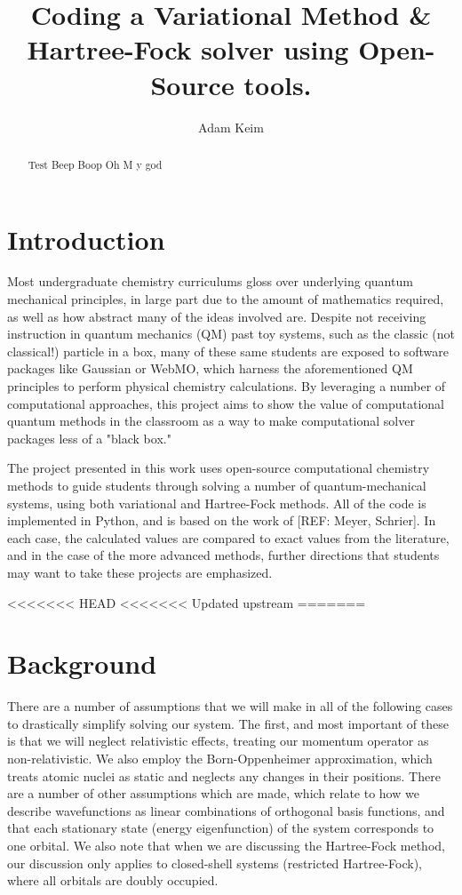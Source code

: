 \documentclass[journal=jacsat,manuscript=communication]{achemso}
\title{Coding a Variational Method \& Hartree-Fock solver using Open-Source tools.}
\author{Adam Keim}
\begin{document}
\begin{abstract}
Test Beep Boop Oh M y god 
\end{abstract}
\section{Introduction}
Most undergraduate chemistry curriculums gloss over underlying quantum mechanical principles, in large part due to the amount of mathematics required, as well as how abstract many of the ideas involved are. Despite not receiving instruction in quantum mechanics (QM) past toy systems, such as the classic (not classical!) particle in a box, many of these same students are exposed to software packages like Gaussian or WebMO, which harness the aforementioned QM principles to perform physical chemistry calculations.  By leveraging a number of computational approaches, this project aims to show the value of computational quantum methods in the classroom as a way to make computational solver packages less of a "black box."

The project presented in this work uses open-source computational chemistry methods to guide students through solving a number of quantum-mechanical systems, using both variational and Hartree-Fock methods.  All of the code is implemented in Python, and is based on the work of [REF: Meyer, Schrier].  In each case, the calculated values are compared to exact values from the literature, and in the case of the more advanced methods, further directions that students may want to take these projects are emphasized.


<<<<<<< HEAD
<<<<<<< Updated upstream
=======
\section{Background}
There are a number of assumptions that we will make in all of the following cases to drastically simplify solving our system.  The first, and most important of these is that we will neglect relativistic effects, treating our momentum operator as non-relativistic.  We also employ the Born-Oppenheimer approximation, which treats atomic nuclei as static and neglects any changes in their positions.  There are a number of other assumptions which are made, which relate to how we describe wavefunctions as linear combinations of orthogonal basis functions, and that each stationary state (energy eigenfunction) of the system corresponds to one orbital.  We also note that when we are discussing the Hartree-Fock method, our discussion only applies to closed-shell systems (restricted Hartree-Fock), where all orbitals are doubly occupied. 
\end{document}
